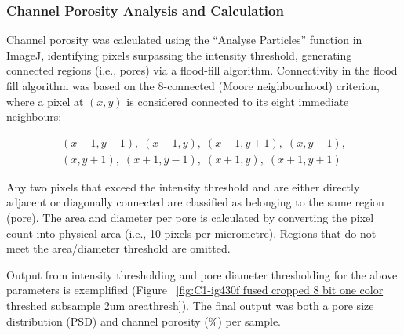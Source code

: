 \documentclass[review]{elsarticle}
\begin{document}
\subsubsection{Channel Porosity Analysis and Calculation}
Channel porosity was calculated using the “Analyse Particles” function in
ImageJ, identifying pixels surpassing the intensity threshold, generating
connected regions (i.e., pores) via a flood-fill algorithm. Connectivity in the
flood fill algorithm was based on the 8-connected (Moore neighbourhood)
criterion, where a pixel at $(x,y)$ is considered connected to its eight
immediate neighbours:

\begin{multline*}
(x-1,y-1),\; (x-1,y),\; (x-1,y+1),\; (x,y-1),\\[4pt]
(x,y+1),\; (x+1,y-1),\; (x+1,y),\; (x+1,y+1)
\end{multline*}

Any two pixels that exceed the intensity threshold and are either directly
adjacent or diagonally connected are classified as belonging to the same region
(pore). The area and diameter per pore is calculated by converting the pixel
count into physical area (i.e., 10 pixels per micrometre). Regions that do not
meet the area/diameter threshold are omitted. 

Output from intensity thresholding and pore diameter thresholding for the above
parameters is exemplified (Figure ~\ref{fig:C1-ig430f fused cropped 8 bit one
color threshed subsample 2um areathresh}). The final output was both a pore size
distribution (PSD) and channel porosity (\%) per sample.
\end{document}
